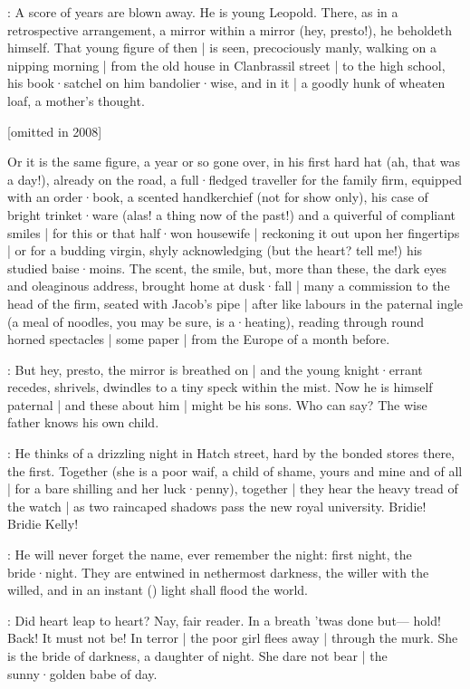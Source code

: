 :
A score of years are blown away.
He is young Leopold.
There,
as in a retrospective arrangement,
a mirror within a mirror
(hey, presto!),
he beholdeth himself.
That young figure of then |
is seen,
precociously manly,
walking on a nipping morning |
from the old house in Clanbrassil street |
to the high school,
his book·satchel on him bandolier·wise,
and in it |
a goodly hunk of wheaten loaf,
a mother's thought.

[omitted in 2008]

Or it is the same figure,
a year or so gone over,
in his first hard hat
(ah, that was a day!),
already on the road,
a full·fledged traveller for the family firm,
equipped with an order·book,
a scented handkerchief
(not for show only),
his case of bright trinket·ware
(alas!
a thing now of the past!)
and a quiverful of compliant smiles |
for this or that half·won housewife |
reckoning it out upon her fingertips |
or for a budding virgin,
shyly acknowledging
(but the heart?
tell me!)
his studied baise·moins.
The scent,
the smile,
but,
more than these,
the dark eyes and oleaginous address,
brought home at dusk·fall |
many a commission to the head of the firm,
seated with Jacob's pipe |
after like labours in the paternal ingle
(a meal of noodles,
you may be sure,
is a·heating),
reading through round horned spectacles |
some paper |
from the Europe of a month before.

:
But hey,
presto,
the mirror is breathed on |
and the young knight·errant recedes,
shrivels,
dwindles to a tiny speck within the mist.
Now he is himself paternal |
and these about him |
might be his sons.
Who can say?
The wise father knows his own child.

:
He thinks of a drizzling night in Hatch street,
hard by the bonded stores there,
the first.
Together
(she is a poor waif,
a child of shame,
yours and mine and of all |
for a bare shilling and her luck·penny),
together |
they hear the heavy tread of the watch |
as two raincaped shadows pass the new royal university.
Bridie!
Bridie Kelly!

:
He will never forget the name,
ever remember the night:
first night,
the bride·night.
They are entwined in nethermost darkness,
the willer with the willed,
and in an instant
()
light shall flood the world.

:
Did heart leap to heart?
Nay,
fair reader.
In a breath 'twas
done but---%
hold!
Back!
It must not be!
In terror |
the poor girl flees away |
through the murk.
She is the bride of darkness,
a daughter of night.
She dare not bear |
the sunny·golden babe of day.

